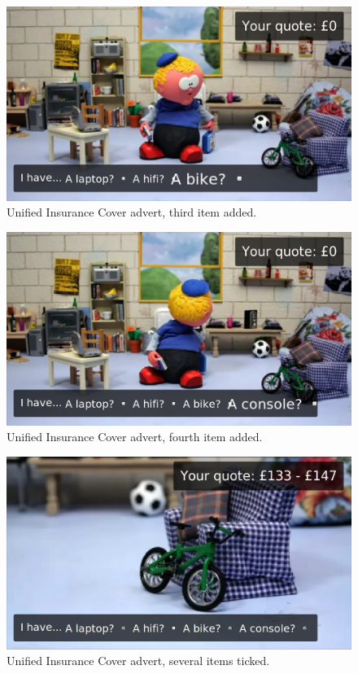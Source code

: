 	\begin{figure}[th]
		\centering
		\includegraphics[width=\textwidth,height=0.5\textheight,keepaspectratio]{images/adverts/unified_insurance_cover-4.png}
		\caption{Unified Insurance Cover advert, third item added.}
		\label{fig:Paddy4}
	\end{figure}

	\begin{figure}[th]
		\centering
		\includegraphics[width=\textwidth,height=0.5\textheight,keepaspectratio]{images/adverts/unified_insurance_cover-5.png}
		\caption{Unified Insurance Cover advert, fourth item added.}
		\label{fig:Paddy5}
	\end{figure}

	\begin{figure}[th]
		\centering
		\includegraphics[width=\textwidth,height=0.5\textheight,keepaspectratio]{images/adverts/unified_insurance_cover-6.png}
		\caption{Unified Insurance Cover advert, several items ticked.}
		\label{fig:Paddy6}
	\end{figure}

